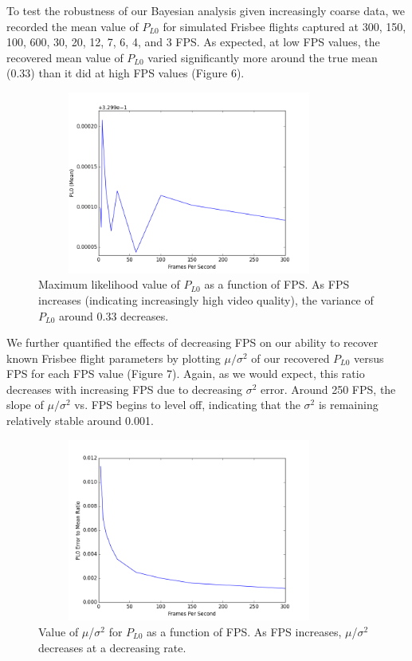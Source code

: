 \documentclass[a4paper,12pt, oneside]{article}
\begin{document}
To test the robustness of our Bayesian analysis given increasingly coarse data, we recorded the mean value of $P_{L0}$ for simulated Frisbee flights captured at 300, 150, 100, 600, 30, 20, 12, 7, 6, 4, and 3 FPS. As expected, at low FPS values, the recovered mean value of $P_{L0}$ varied significantly more around the true mean (0.33) than it did at high FPS values (Figure 6).
\begin{figure}[H]
        \includegraphics[width=10cm, height=6cm]{meanvsFPS}
	\centering
	\caption{Maximum likelihood value of $P_{L0}$ as a function of FPS. As FPS increases (indicating increasingly high video quality), the variance of $P_{L0}$ around 0.33 decreases.}
\end{figure}

We further quantified the effects of decreasing FPS on our ability to recover known Frisbee flight parameters by plotting $\mu/\sigma^2$ of our recovered $P_{L0}$ versus FPS for each FPS value (Figure 7). Again, as we would expect, this ratio decreases with increasing FPS due to decreasing $\sigma^2$ error. Around 250 FPS, the slope of $\mu/\sigma^2$ vs. FPS begins to level off, indicating that the $\sigma^2$ is remaining relatively stable around 0.001. 

\begin{figure}[H]
        \includegraphics[width=10cm, height=6cm]{errortomeanratiovsFPS}
	\centering
	\caption{Value of $\mu$/$\sigma^2$ for $P_{L0}$ as a function of FPS. As FPS increases, $\mu$/$\sigma^2$ decreases at a decreasing rate.}
\end{figure}
\end{document}
